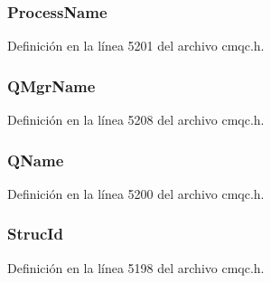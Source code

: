 \subsubsection[{Process\+Name}]{ Process\+Name}\label{structtag_m_q_t_m_c2_a45e2a82a9d94471dd5e7f07d814b4bfb}


Definición en la línea 5201 del archivo cmqc.\+h.

\hypertarget{structtag_m_q_t_m_c2_a9a487b826b5df3b56f6367613e000b28}{}
\subsubsection[{Q\+Mgr\+Name}]{ Q\+Mgr\+Name}\label{structtag_m_q_t_m_c2_a9a487b826b5df3b56f6367613e000b28}


Definición en la línea 5208 del archivo cmqc.\+h.

\hypertarget{structtag_m_q_t_m_c2_adb95258c4248dc60e3647d2abab48a52}{}
\subsubsection[{Q\+Name}]{ Q\+Name}\label{structtag_m_q_t_m_c2_adb95258c4248dc60e3647d2abab48a52}


Definición en la línea 5200 del archivo cmqc.\+h.

\hypertarget{structtag_m_q_t_m_c2_a0530922ca944569b52601d74941f96e4}{}
\subsubsection[{Struc\+Id}]{ Struc\+Id}\label{structtag_m_q_t_m_c2_a0530922ca944569b52601d74941f96e4}


Definición en la línea 5198 del archivo cmqc.\+h.

\hypertarget{structtag_m_q_t_m_c2_a172805e57851aa511b91533dd357ab99}{}

